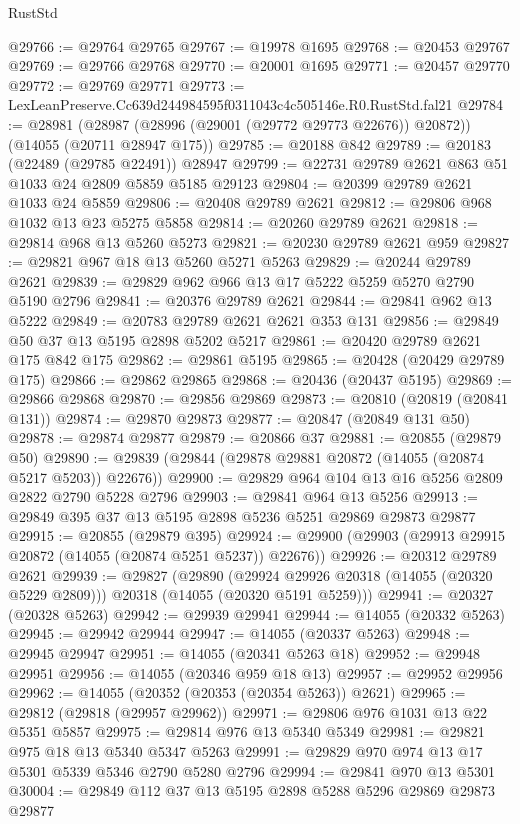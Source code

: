 \begin{lexlean}{RustStd}
\begin{coremodule}
@29766 := @29764 @29765
@29767 := @19978 @1695
@29768 := @20453 @29767
@29769 := @29766 @29768
@29770 := @20001 @1695
@29771 := @20457 @29770
@29772 := @29769 @29771
@29773 := LexLeanPreserve.Cc639d244984595f0311043c4c505146e.R0.RustStd.fal21
@29784 := @28981
    (@28987 (@28996 (@29001 (@29772 @29773 @22676)) @20872))
    (@14055 (@20711 @28947 @175))
@29785 := @20188 @842
@29789 := @20183 (@22489 (@29785 @22491)) @28947
@29799 := @22731 @29789 @2621 @863 @51 @1033 @24 @2809 @5859 @5185 @29123
@29804 := @20399 @29789 @2621 @1033 @24 @5859
@29806 := @20408 @29789 @2621
@29812 := @29806 @968 @1032 @13 @23 @5275 @5858
@29814 := @20260 @29789 @2621
@29818 := @29814 @968 @13 @5260 @5273
@29821 := @20230 @29789 @2621 @959
@29827 := @29821 @967 @18 @13 @5260 @5271 @5263
@29829 := @20244 @29789 @2621
@29839 := @29829 @962 @966 @13 @17 @5222 @5259 @5270 @2790 @5190 @2796
@29841 := @20376 @29789 @2621
@29844 := @29841 @962 @13 @5222
@29849 := @20783 @29789 @2621 @2621 @353 @131
@29856 := @29849 @50 @37 @13 @5195 @2898 @5202 @5217
@29861 := @20420 @29789 @2621 @175 @842 @175
@29862 := @29861 @5195
@29865 := @20428 (@20429 @29789 @175)
@29866 := @29862 @29865
@29868 := @20436 (@20437 @5195)
@29869 := @29866 @29868
@29870 := @29856 @29869
@29873 := @20810 (@20819 (@20841 @131))
@29874 := @29870 @29873
@29877 := @20847 (@20849 @131 @50)
@29878 := @29874 @29877
@29879 := @20866 @37
@29881 := @20855 (@29879 @50)
@29890 := @29839 (@29844 (@29878 @29881 @20872 (@14055 (@20874 @5217 @5203)) @22676))
@29900 := @29829 @964 @104 @13 @16 @5256 @2809 @2822 @2790 @5228 @2796
@29903 := @29841 @964 @13 @5256
@29913 := @29849 @395 @37 @13 @5195 @2898 @5236 @5251 @29869 @29873 @29877
@29915 := @20855 (@29879 @395)
@29924 := @29900 (@29903 (@29913 @29915 @20872 (@14055 (@20874 @5251 @5237)) @22676))
@29926 := @20312 @29789 @2621
@29939 := @29827
    (@29890
      (@29924 @29926 @20318 (@14055 (@20320 @5229 @2809)))
      @20318
      (@14055 (@20320 @5191 @5259)))
@29941 := @20327 (@20328 @5263)
@29942 := @29939 @29941
@29944 := @14055 (@20332 @5263)
@29945 := @29942 @29944
@29947 := @14055 (@20337 @5263)
@29948 := @29945 @29947
@29951 := @14055 (@20341 @5263 @18)
@29952 := @29948 @29951
@29956 := @14055 (@20346 @959 @18 @13)
@29957 := @29952 @29956
@29962 := @14055 (@20352 (@20353 (@20354 @5263)) @2621)
@29965 := @29812 (@29818 (@29957 @29962))
@29971 := @29806 @976 @1031 @13 @22 @5351 @5857
@29975 := @29814 @976 @13 @5340 @5349
@29981 := @29821 @975 @18 @13 @5340 @5347 @5263
@29991 := @29829 @970 @974 @13 @17 @5301 @5339 @5346 @2790 @5280 @2796
@29994 := @29841 @970 @13 @5301
@30004 := @29849 @112 @37 @13 @5195 @2898 @5288 @5296 @29869 @29873 @29877

\end{coremodule}
\end{lexlean}
